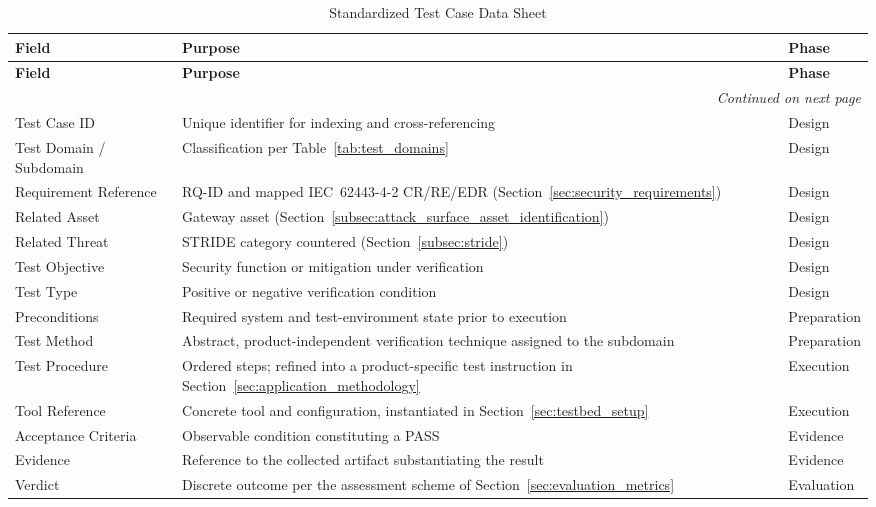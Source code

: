 \begin{longtable}{|p{}|p{}|p{}|}
	\caption{Standardized Test Case Data Sheet} 
	\label{tab:test_case_sheet}\\ 
	\hline 
	\textbf{Field} & \textbf{Purpose} & \textbf{Phase} \\ \hline 
	\endfirsthead \hline 
	\textbf{Field} & \textbf{Purpose} & \textbf{Phase} \\ \hline 
	\endhead \hline
	\multicolumn{3}{r}{\textit{Continued on next page}} \\ \hline 
	\endfoot \hline 
	\endlastfoot 
	Test Case ID & Unique identifier for indexing and cross-referencing & Design \\ \hline 
	Test Domain / Subdomain & Classification per Table~\ref{tab:test_domains} & Design \\ \hline 
	Requirement Reference & RQ-ID and mapped IEC~62443-4-2 CR/RE/EDR (Section~\ref{sec:security_requirements}) & Design \\ \hline 
	Related Asset & Gateway asset (Section~\ref{subsec:attack_surface_asset_identification}) & Design \\ \hline 
	Related Threat & STRIDE category countered (Section~\ref{subsec:stride}) & Design \\ \hline 
	Test Objective & Security function or mitigation under verification & Design \\ \hline 
	Test Type & Positive or negative verification condition & Design \\ \hline 
	Preconditions & Required system and test-environment state prior to execution & Preparation \\ \hline 
	Test Method & Abstract, product-independent verification technique assigned to the subdomain & Preparation \\ \hline 
	Test Procedure & Ordered steps; refined into a product-specific test instruction in Section~\ref{sec:application_methodology} & Execution \\ \hline 
	Tool Reference & Concrete tool and configuration, instantiated in Section~\ref{sec:testbed_setup} & Execution \\ \hline Acceptance Criteria & Observable condition constituting a PASS & Evidence \\ \hline 
	Evidence & Reference to the collected artifact substantiating the result & Evidence \\ \hline 
	Verdict & Discrete outcome per the assessment scheme of Section~\ref{sec:evaluation_metrics} & Evaluation \\ \hline 
\end{longtable}





